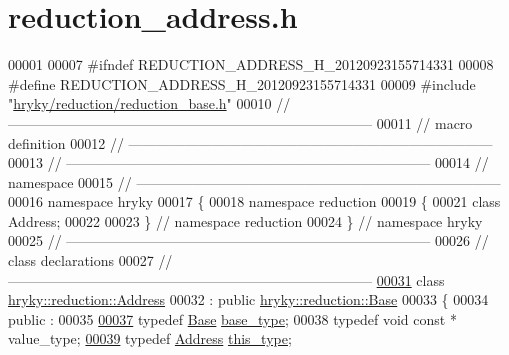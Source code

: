 \hypertarget{reduction__address_8h_source}{\section{reduction\-\_\-address.\-h}
}

\begin{DoxyCode}
00001 
00007 \textcolor{preprocessor}{#ifndef REDUCTION\_ADDRESS\_H\_20120923155714331}
00008 \textcolor{preprocessor}{}\textcolor{preprocessor}{#define REDUCTION\_ADDRESS\_H\_20120923155714331}
00009 \textcolor{preprocessor}{}\textcolor{preprocessor}{#include "\hyperlink{reduction__base_8h}{hryky/reduction/reduction_base.h}"}
00010 \textcolor{comment}{//
      ------------------------------------------------------------------------------}
00011 \textcolor{comment}{// macro definition}
00012 \textcolor{comment}{//
      ------------------------------------------------------------------------------}
00013 \textcolor{comment}{//
      ------------------------------------------------------------------------------}
00014 \textcolor{comment}{// namespace}
00015 \textcolor{comment}{//
      ------------------------------------------------------------------------------}
00016 \textcolor{keyword}{namespace }hryky
00017 \{
00018 \textcolor{keyword}{namespace }reduction
00019 \{
00021     \textcolor{keyword}{class }Address;
00022 
00023 \} \textcolor{comment}{// namespace reduction}
00024 \} \textcolor{comment}{// namespace hryky}
00025 \textcolor{comment}{//
      ------------------------------------------------------------------------------}
00026 \textcolor{comment}{// class declarations}
00027 \textcolor{comment}{//
      ------------------------------------------------------------------------------}
\hypertarget{reduction__address_8h_source_l00031}{}\hyperlink{classhryky_1_1reduction_1_1_address}{00031} \textcolor{comment}{}\textcolor{keyword}{class }\hyperlink{classhryky_1_1reduction_1_1_address}{hryky::reduction::Address}
00032     : \textcolor{keyword}{public} \hyperlink{classhryky_1_1reduction_1_1_base}{hryky::reduction::Base}
00033 \{
00034 \textcolor{keyword}{public} :
00035 
\hypertarget{reduction__address_8h_source_l00037}{}\hyperlink{classhryky_1_1reduction_1_1_address_a9b98a290b52c765b64348909a9c4275f}{00037}     \textcolor{keyword}{typedef} \hyperlink{classhryky_1_1reduction_1_1_base}{Base}            \hyperlink{classhryky_1_1reduction_1_1_address_a9b98a290b52c765b64348909a9c4275f}{base_type};
00038     \textcolor{keyword}{typedef} \textcolor{keywordtype}{void} \textcolor{keyword}{const} *    value\_type;
\hypertarget{reduction__address_8h_source_l00039}{}\hyperlink{classhryky_1_1reduction_1_1_address_aab723227e4610c73cfa610169d14ad54}{00039}     \textcolor{keyword}{typedef} \hyperlink{classhryky_1_1reduction_1_1_address}{Address}         \hyperlink{classhryky_1_1reduction_1_1_address_aab723227e4610c73cfa610169d14ad54}{this_type};

\end{DoxyCode}
